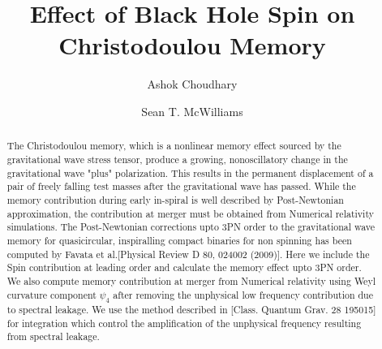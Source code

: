 \documentclass[prd,preprintnumbers,twocolumn,eqsecnum,floatfix,letter]{revtex4}
\begin{document}
\newcommand{\be}{\begin{equation}}
\newcommand{\ee}{\end{equation}}
\newcommand{\ber}{\begin{eqnarray}}
\newcommand{\eer}{\end{eqnarray}}
\def\bea{\begin{eqnarray}}
\def\eea{\end{eqnarray}}
\newcommand{\etal}{\emph{et al.}}

\newcommand{\Sl}{S_\ell}
\newcommand{\Sigmal}{\Sigma_\ell}
\newcommand{\Flux}{\mathcal{F}}
\newcommand{\LNh}{\hat{\mathbf{L}}_N}
\newcommand{\LN}{\mathbf{L}_N}
\newcommand{\bS}{\mathbf{S}}
\newcommand{\bJ}{\mathbf{J}}
\newcommand{\e}{\mathrm{e}}
\newcommand{\rmi}{\mathrm{i}}
\newcommand{\flow}{f_\mathrm{low}}
\newcommand{\fcut}{f_\mathrm{cut}}

\newcommand{\bchi}{\bm{\chi}}
\newcommand{\blambda}{\bm{\lambda}}
\newcommand{\bLambda}{\bm{\Lambda}}
\newcommand{\bchia}{\bm{\chi}_a}
\newcommand{\bchis}{\bm{\chi}_s}
\newcommand{\chis}{\chi_s}
\newcommand{\chia}{\chi_a}
\newcommand{\chiadL}{\bchia \cdot \LNh}
\newcommand{\chisdL}{\bchis \cdot \LNh}
\newcommand{\chisSqr}{\bchis^2}
\newcommand{\chiaSqr}{\bchia^2}
\newcommand{\chisDchia}{\bchis \cdot \bchia}
\newcommand{\cA}{\mathcal{A}}
\newcommand{\cB}{\mathcal{B}}
\newcommand{\cC}{\mathcal{C}}
\newcommand{\cP}{\mathcal{P}}
\newcommand{\pc}{{+,\times}}

\title{Effect of Black Hole Spin on Christodoulou Memory}
\author{Ashok Choudhary}
\author{Sean T. McWilliams}


\begin{abstract}
	The Christodoulou memory, which is a nonlinear memory effect sourced by the gravitational wave stress tensor, produce a growing, nonoscillatory change in the gravitational wave "plus" polarization. This results in the permanent displacement of a pair of freely falling test masses after the gravitational wave has passed. While the memory contribution during early in-spiral is well described by Post-Newtonian approximation, the contribution at merger must be obtained from Numerical relativity simulations. The Post-Newtonian corrections upto 3PN order to the gravitational wave memory for quasicircular, inspiralling compact binaries for non spinning has been computed by Favata et al.[Physical Review D 80, 024002 (2009)]. Here we include the Spin contribution at leading order and calculate the memory effect upto 3PN order. We also compute memory contribution at merger from Numerical relativity using Weyl curvature component $\psi_4$ after removing the unphysical low frequency contribution due to spectral leakage. We use the method described in [Class. Quantum Grav. 28 195015] for integration which control the amplification of the unphysical frequency resulting from spectral leakage. 
\end{abstract}
\end{document}

